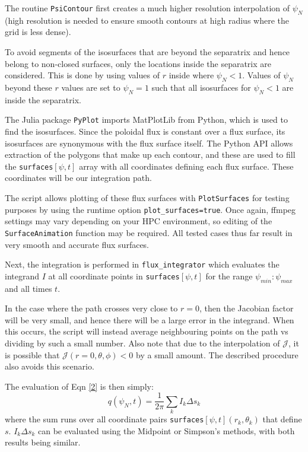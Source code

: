 \documentclass[12pt]{article}
\begin{document}
The routine \texttt{PsiContour} first creates a much higher resolution interpolation of $\psi_N$ (high resolution is needed to ensure smooth contours at high radius where the grid is less dense).

To avoid segments of the isosurfaces that are beyond the separatrix and hence belong to non-closed surfaces, only the locations inside the separatrix are considered.
This is done by using values of $r$ inside where $\psi_N < 1$.
Values of $\psi_N$ beyond these $r$ values are set to $\psi_N = 1$ such that all isosurfaces for $\psi_N < 1$ are inside the separatrix.

The Julia package \texttt{PyPlot} imports MatPlotLib from Python, which is used to find the isosurfaces.
Since the poloidal flux is constant over a flux surface, its isosurfaces are synonymous with the flux surface itself.
The Python API allows extraction of the polygons that make up each contour, and these are used to fill the \texttt{surfaces}$[\psi,t]$ array with all coordinates defining each flux surface.
These coordinates will be our integration path.

The script allows plotting of these flux surfaces with \texttt{PlotSurfaces} for testing purposes by using the runtime option \texttt{plot\_surfaces=true}.
Once again, ffmpeg settings may vary depending on your HPC environment, so editing of the \texttt{SurfaceAnimation} function may be required.
All tested cases thus far result in very smooth and accurate flux surfaces.

Next, the integration is performed in \texttt{flux\_integrator} which evaluates the integrand $I$ at all coordinate points in \texttt{surfaces}$[\psi,t]$ for the range $\psi_{min} : \psi_{max}$ and all times $t$.

In the case where the path crosses very close to $r=0$, then the Jacobian factor will be very small, and hence there will be a large error in the integrand.
When this occurs, the script will instead average neighbouring points on the path vs dividing by such a small number.
Also note that due to the interpolation of $\mathcal{J}$, it is possible that $\mathcal{J}(r=0,\theta,\phi) < 0$  by a small amount.
The described procedure also avoids this scenario.

The evaluation of Eqn \eqref{2} is then simply:
\begin{equation}\label{18}
    q(\psi_N,t) = \frac{1}{2\pi} \sum_k I_k \Delta s_k
\end{equation}
where the sum runs over all coordinate pairs \texttt{surfaces}$[\psi,t]$$(r_k,\theta_k)$ that define $s$.
$I_k \Delta s_k$ can be evaluated using the Midpoint or Simpson's methods, with both results being similar.
\end{document}

